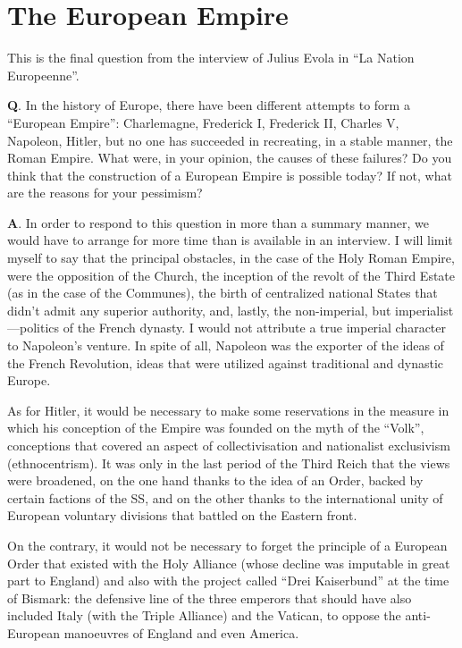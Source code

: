 \section{The European Empire}

\begin{quotex}
This is the final question from the interview of Julius Evola in ``La Nation Europeenne''.
\end{quotex}

\textbf{Q}. In the history of Europe, there have been different attempts to form a ``European Empire'': Charlemagne, Frederick I, Frederick II, Charles V, Napoleon, Hitler, but no one has succeeded in recreating, in a stable manner, the Roman Empire. What were, in your opinion, the causes of these failures? Do you think that the construction of a European Empire is possible today? If not, what are the reasons for your pessimism?

\textbf{A}. In order to respond to this question in more than a summary manner, we would have to arrange for more time than is available in an interview. I will limit myself to say that the principal obstacles, in the case of the Holy Roman Empire, were the opposition of the Church, the inception of the revolt of the Third Estate (as in the case of the Communes), the birth of centralized national States that didn't admit any superior authority, and, lastly, the non-imperial, but imperialist---politics of the French dynasty. I would not attribute a true imperial character to Napoleon's venture. In spite of all, Napoleon was the exporter of the ideas of the French Revolution, ideas that were utilized against traditional and dynastic Europe.

As for Hitler, it would be necessary to make some reservations in the measure in which his conception of the Empire was founded on the myth of the ``Volk'', conceptions that covered an aspect of collectivisation and nationalist exclusivism (ethnocentrism). It was only in the last period of the Third Reich that the views were broadened, on the one hand thanks to the idea of an Order, backed by certain factions of the SS, and on the other thanks to the international unity of European voluntary divisions that battled on the Eastern front.

On the contrary, it would not be necessary to forget the principle of a European Order that existed with the Holy Alliance (whose decline was imputable in great part to England) and also with the project called ``Drei Kaiserbund'' at the time of Bismark: the defensive line of the three emperors that should have also included Italy (with the Triple Alliance) and the Vatican, to oppose the anti-European manoeuvres of England and even America.

